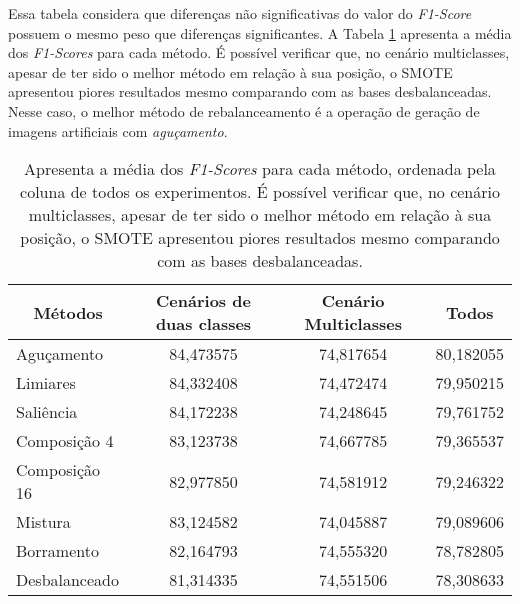 Essa tabela considera que diferenças não significativas do valor do \textit{F1-Score} possuem o mesmo peso que diferenças significantes. A Tabela \ref{tab:allfscore} apresenta a média dos \textit{F1-Scores} para cada método. É possível verificar que, no cenário multiclasses, apesar de ter sido o melhor método em relação à sua posição, o SMOTE apresentou piores resultados mesmo comparando com as bases desbalanceadas. Nesse caso, o melhor método de rebalanceamento é a operação de geração de imagens artificiais com \textit{aguçamento}.

\begin{table}[!htbp]
\centering
\caption{Apresenta a média dos \textit{F1-Scores} para cada método, ordenada pela coluna de todos os experimentos. É possível verificar que, no cenário multiclasses, apesar de ter sido o melhor método em relação à sua posição, o SMOTE apresentou piores resultados mesmo comparando com as bases desbalanceadas.}
\label{tab:allfscore}
\begin{tabular}{|l|c|c|c|}
\hline
\multicolumn{1}{|c|}{\textbf{Métodos}} & \textbf{Cenários de duas classes} & \textbf{Cenário Multiclasses} & \textbf{Todos} \\ \hline
Aguçamento                             & 84,473575                         & 74,817654                     & 80,182055      \\ \hline
Limiares                               & 84,332408                         & 74,472474                     & 79,950215      \\ \hline
Saliência                              & 84,172238                         & 74,248645                     & 79,761752      \\ \hline
Composição 4                           & 83,123738                         & 74,667785                     & 79,365537      \\ \hline
Composição 16                          & 82,977850                         & 74,581912                     & 79,246322      \\ \hline
Mistura                                & 83,124582                         & 74,045887                     & 79,089606      \\ \hline
Borramento                             & 82,164793                         & 74,555320                     & 78,782805      \\ \hline
Desbalanceado                          & 81,314335                         & 74,551506                     & 78,308633      \\ \hline

\end{tabular}
\end{table}
